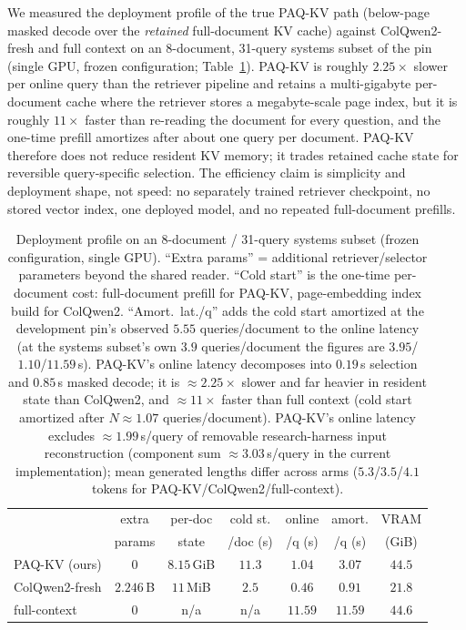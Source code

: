 \documentclass[letterpaper]{article} %
\newcommand{\paqc}{\textsc{PAQ-KV}}
\begin{document}
We measured the deployment profile of the true \paqc{} path (below-page
masked decode over the \emph{retained} full-document KV cache) against
ColQwen2-fresh and full context on an 8-document, 31-query systems subset of
the pin (single GPU, frozen configuration; Table~\ref{tab:systems}). \paqc{}
is roughly $2.25\times$ slower per online query than the retriever pipeline
and retains a multi-gigabyte per-document cache where the retriever stores a
megabyte-scale page index, but it is roughly $11\times$ faster than
re-reading the document for every question, and the one-time prefill
amortizes after about one query per document. \paqc{} therefore does not
reduce resident KV memory; it trades retained cache state for reversible
query-specific selection. The efficiency claim is simplicity and deployment
shape, not speed: no separately trained retriever checkpoint, no stored
vector index, one deployed model, and no repeated full-document prefills.

\begin{table}[t]
\centering\small
\setlength{\tabcolsep}{4pt}%
\setlength{\tabcolsep}{1.2pt}%
\begin{tabular}{lcccccc}
\toprule
 & extra & per-doc & cold st. & online & amort. & VRAM \\
 & params & state & /doc (s) & /q (s) & /q (s) & (GiB) \\
\midrule
\paqc{} (ours)   & $0$        & $8.15$\,GiB & $11.3$ & $1.04$  & $3.07$  & $44.5$ \\
ColQwen2-fresh   & $2.246$\,B & $11$\,MiB   & $2.5$  & $0.46$  & $0.91$  & $21.8$ \\
full-context     & $0$        & n/a         & n/a    & $11.59$ & $11.59$ & $44.6$ \\
\bottomrule
\end{tabular}
\caption{Deployment profile on an 8-document / 31-query systems subset (frozen configuration, single GPU). ``Extra params'' = additional retriever/selector parameters beyond the shared reader. ``Cold start'' is the one-time per-document cost: full-document prefill for \paqc{}, page-embedding index build for ColQwen2. ``Amort.\ lat./q'' adds the cold start amortized at the development pin's observed $5.55$ queries/document to the online latency (at the systems subset's own $3.9$ queries/document the figures are $3.95$/$1.10$/$11.59$\,s). \paqc{}'s online latency decomposes into $0.19$\,s selection and $0.85$\,s masked decode; it is ${\approx}2.25\times$ slower and far heavier in resident state than ColQwen2, and ${\approx}11\times$ faster than full context (cold start amortized after $N{\approx}1.07$ queries/document). \paqc{}'s online latency excludes ${\approx}1.99$\,s/query of removable research-harness input reconstruction (component sum ${\approx}3.03$\,s/query in the current implementation); mean generated lengths differ across arms ($5.3$/$3.5$/$4.1$ tokens for \paqc{}/ColQwen2/full-context).}
\label{tab:systems}
\end{table}
\end{document}
